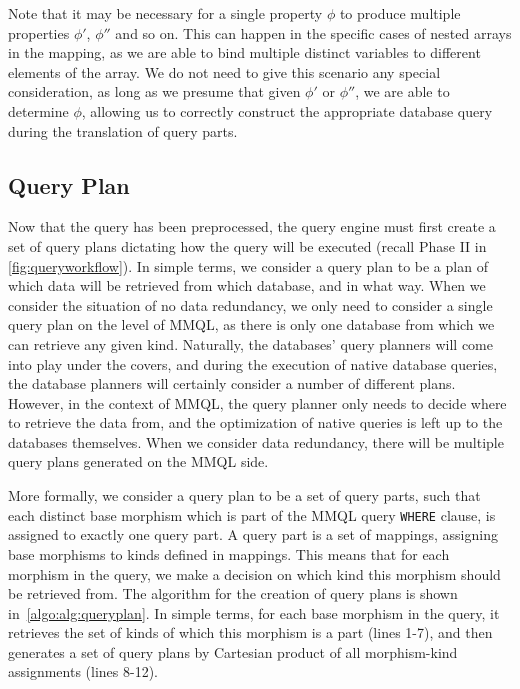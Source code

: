 Note that it may be necessary for a single property $\phi$ to produce multiple properties $\phi'$, $\phi''$ and so on.
This can happen in the specific cases of nested arrays in the mapping, as we are able to bind multiple distinct variables to different elements of the array.
We do not need to give this scenario any special consideration, as long as we presume that given $\phi'$ or $\phi''$, we are able to determine $\phi$, allowing us to correctly construct the appropriate database query during the translation of query parts.

\subsection{Query Plan}
\label{algo:subsection:queryplan}

Now that the query has been preprocessed, the query engine must first create a set of query plans dictating how the query will be executed (recall Phase II in \cref{fig:queryworkflow}).
In simple terms, we consider a query plan to be a plan of which data will be retrieved from which database, and in what way.
When we consider the situation of no data redundancy, we only need to consider a single query plan on the level of MMQL, as there is only one database from which we can retrieve any given kind.
Naturally, the databases' query planners will come into play under the covers, and during the execution of native database queries, the database planners will certainly consider a number of different plans.
However, in the context of MMQL, the query planner only needs to decide where to retrieve the data from, and the optimization of native queries is left up to the databases themselves.
When we consider data redundancy, there will be multiple query plans generated on the MMQL side.

More formally, we consider a query plan to be a set of query parts, such that each distinct base morphism which is part of the MMQL query \texttt{WHERE} clause, is assigned to exactly one query part.
A query part is a set of mappings, assigning base morphisms to kinds defined in mappings.
This means that for each morphism in the query, we make a decision on which kind this morphism should be retrieved from.
The algorithm for the creation of query plans is shown in~\cref{algo:alg:queryplan}.
In simple terms, for each base morphism in the query, it retrieves the set of kinds of which this morphism is a part (lines 1-7), and then generates a set of query plans by Cartesian product of all morphism-kind assignments (lines 8-12).

